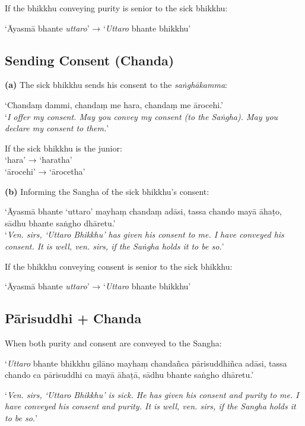 If the bhikkhu conveying purity is senior to the sick bhikkhu:

‘Āyasmā bhante \emph{uttaro}’ → ‘\emph{Uttaro} bhante bhikkhu’

\subsection{Sending Consent (Chanda)}

\textbf{(a)} The sick bhikkhu sends his consent to the \emph{saṅghākamma}:

‘Chandaṃ dammi, chandaṃ me hara, chandaṃ me ārocehi.’\\
‘\emph{I offer my consent. May you convey my consent (to the Saṅgha). May you
  declare my consent to them.}’

If the sick bhikkhu is the junior:\\
‘hara’ → ‘haratha’\\
‘ārocehi’ → ‘ārocetha’

\textbf{(b)} Informing the Sangha of the sick bhikkhu's consent:

‘Āyasmā bhante ‘uttaro’ mayhaṃ chandaṃ adāsi, tassa chando mayā āhaṭo, sādhu bhante saṅgho dhāretu.’\\
‘\emph{Ven. sirs, ‘Uttaro Bhikkhu’ has given his consent to me. I have conveyed
  his consent. It is well, ven. sirs, if the Saṅgha holds it to be so.}’

If the bhikkhu conveying consent is senior to the sick bhikkhu:

‘Āyasmā bhante \emph{uttaro}’ → ‘\emph{Uttaro} bhante bhikkhu’

\subsection{Pārisuddhi + Chanda}

When both purity and consent are conveyed to the Sangha:

‘\emph{Uttaro} bhante bhikkhu gilāno mayhaṃ chandañca pārisuddhiñca adāsi, tassa
chando ca pārisuddhi ca mayā āhaṭā, sādhu bhante saṅgho dhāretu.’

‘\emph{Ven. sirs, ‘Uttaro Bhikkhu’ is sick. He has given his consent and purity
  to me. I have conveyed his consent and purity. It is well, ven. sirs, if the
  Sangha holds it to be so.}’

